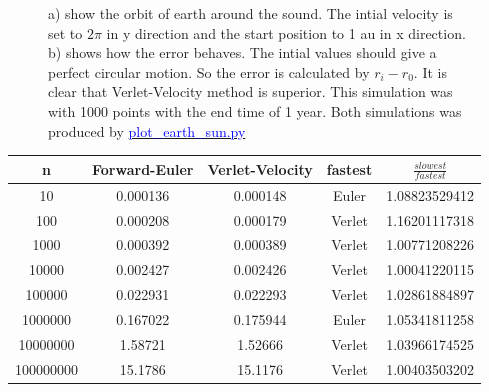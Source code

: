 \begin{figure}[H]
\begin{subfigure}{0.5\textwidth}
        \caption{}
    \end{subfigure}
    \caption{a) show the orbit of earth around the sound. The intial velocity is set to $2\pi$ in y direction and the start position to 1 au in x direction. b) shows how the error behaves. The intial values should give a perfect circular motion. So the error is calculated by $r_i - r_{0}$. It is clear that Verlet-Velocity method is superior. This simulation was with 1000 points with the end time of 1 year. Both simulations was produced by \href{https://github.com/erikfsk/Project-3/blob/master/Project3/3a/plot_earth_sun.py}{\textcolor{blue}{plot\_earth\_sun.py}}}
    \label{fig:earth-sun}
\end{figure}


\begin{center}
\label{table:euler-verlet-time}
\begin{tabular}{c c c c c}
    \hline 
    \hline 
    n & Forward-Euler & Verlet-Velocity &  fastest & $\frac{slowest}{fastest}$\\ 
    \hline
    10 & 0.000136 & 0.000148 & Euler &   1.08823529412   \\ 
    100 & 0.000208 & 0.000179 & Verlet &   1.16201117318   \\ 
    1000 & 0.000392 & 0.000389 & Verlet &  1.00771208226   \\ 
    10000 & 0.002427 & 0.002426 & Verlet &   1.00041220115  \\ 
    100000 & 0.022931 & 0.022293 & Verlet &   1.02861884897   \\ 
    1000000 & 0.167022 & 0.175944 & Euler &   1.05341811258  \\ 
    10000000 & 1.58721 & 1.52666 & Verlet &   1.03966174525  \\ 
    100000000 & 15.1786 & 15.1176 & Verlet &   1.00403503202  \\ 
    \hline
\end{tabular}
\end{center}














